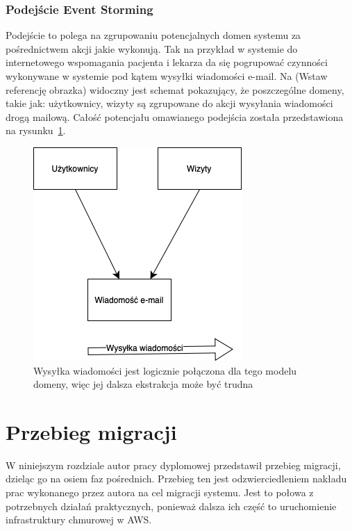 \documentclass[12pt,twoside]{book}
\newcommand{\captionvspace}{\vspace{6pt}}
\begin{document}
    \subsection{Podejście Event Storming}
    Podejście to polega na zgrupowaniu potencjalnych domen systemu za pośrednictwem akcji jakie wykonują. Tak na przykład w systemie do internetowego wspomagania pacjenta i lekarza da się pogrupować czynności wykonywane w systemie pod kątem wysyłki wiadomości e-mail. Na (Wstaw referencję obrazka) widoczny jest schemat pokazujący, że poszczególne domeny, takie jak: użytkownicy, wizyty są zgrupowane do akcji wysyłania wiadomości drogą mailową. Całość potencjału omawianego podejścia została przedstawiona na rysunku~\ref{fig:event-storming-approach}.

    \begin{figure}[ht]
        \centering
        \includegraphics[width=\textwidth]{includes/images/event-storming-approach.png}
        \captionvspace
        \caption{Wysyłka wiadomości jest logicznie połączona dla tego modelu domeny, więc jej dalsza ekstrakcja może być trudna}
        \label{fig:event-storming-approach}
    \end{figure}


    \chapter{Przebieg migracji}
    W niniejszym rozdziale autor pracy dyplomowej przedstawił przebieg migracji, dzieląc go na osiem faz pośrednich. Przebieg ten jest odzwierciedleniem nakładu prac wykonanego przez autora na cel migracji systemu. Jest to połowa z potrzebnych działań praktycznych, ponieważ dalsza ich część to uruchomienie infrastruktury chmurowej w AWS.
\end{document}
